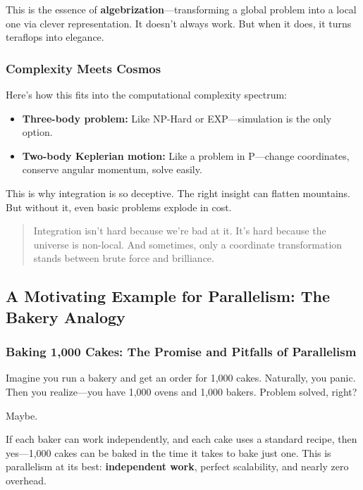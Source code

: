 This is the essence of \textbf{algebrization}—transforming a global problem into a local one via clever representation. It doesn’t always work. But when it does, it turns teraflops into elegance.

\subsubsection{Complexity Meets Cosmos}

Here’s how this fits into the computational complexity spectrum:

\begin{itemize}
  \item \textbf{Three-body problem:} Like NP-Hard or EXP—simulation is the only option.
  \item \textbf{Two-body Keplerian motion:} Like a problem in P—change coordinates, conserve angular momentum, solve easily.
\end{itemize}

This is why integration is so deceptive. The right insight can flatten mountains. But without it, even basic problems explode in cost.

\begin{quote}
Integration isn’t hard because we’re bad at it. It’s hard because the universe is non-local. And sometimes, only a coordinate transformation stands between brute force and brilliance.
\end{quote}


\subsection{A Motivating Example for Parallelism: The Bakery Analogy}

\subsubsection{Baking 1,000 Cakes: The Promise and Pitfalls of Parallelism}

Imagine you run a bakery and get an order for 1,000 cakes. Naturally, you panic. Then you realize—you have 1,000 ovens and 1,000 bakers. Problem solved, right?

Maybe.

If each baker can work independently, and each cake uses a standard recipe, then yes—1,000 cakes can be baked in the time it takes to bake just one. This is parallelism at its best: \textbf{independent work}, perfect scalability, and nearly zero overhead.

